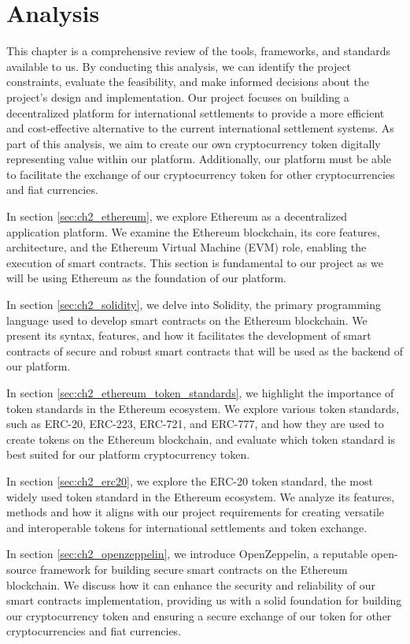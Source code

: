 \chapter{Analysis}
\label{ch:analysis}

This chapter is a comprehensive review of the tools, frameworks, and standards available to us. By conducting this analysis, we can identify the project constraints, evaluate the feasibility,
and make informed decisions about the project's design and implementation. Our project focuses on building a decentralized platform for international
settlements to provide a more efficient and cost-effective alternative to the current international settlement systems. As part of this analysis,
we aim to create our own cryptocurrency token digitally representing value within our platform. Additionally, our platform must be
able to facilitate the exchange of our cryptocurrency token for other cryptocurrencies and fiat currencies.

In section \ref{sec:ch2_ethereum}, we explore Ethereum as a decentralized application platform. We examine the Ethereum blockchain, its core features,
architecture, and the Ethereum Virtual Machine (EVM) role, enabling the execution of smart contracts. This section is fundamental to our project
as we will be using Ethereum as the foundation of our platform.

In section \ref{sec:ch2_solidity}, we delve into Solidity, the primary programming language used to develop smart contracts on the Ethereum blockchain.
We present its syntax, features, and how it facilitates the development of smart contracts of secure and robust smart contracts that will be used as the backend
of our platform.

In section \ref{sec:ch2_ethereum_token_standards}, we highlight the importance of token standards in the Ethereum ecosystem. We explore various token standards,
such as ERC-20, ERC-223, ERC-721, and ERC-777, and how they are used to create tokens on the Ethereum blockchain, and evaluate which token standard is best
suited for our platform cryptocurrency token.

In section \ref{sec:ch2_erc20}, we explore the ERC-20 token standard, the most widely used token standard in the Ethereum ecosystem. We analyze its features,
methods and how it aligns with our project requirements for creating versatile and interoperable tokens for international settlements and token exchange.

In section \ref{sec:ch2_openzeppelin}, we introduce OpenZeppelin, a reputable open-source framework for building secure smart contracts on the Ethereum blockchain.
We discuss how it can enhance the security and reliability of our smart contracts implementation, providing us with a solid foundation for building our
cryptocurrency token and ensuring a secure exchange of our token for other cryptocurrencies and fiat currencies.

